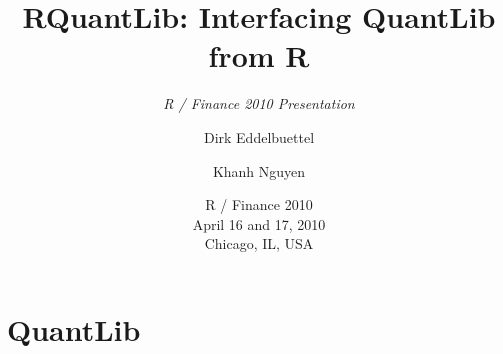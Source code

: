 \documentclass[compress]{beamer}
\title[RQuantLib]{RQuantLib: Interfacing QuantLib from R}  %
\subtitle{\textsl{R / Finance 2010 Presentation}}
\author[Eddelbuettel and Nguyen]{Dirk Eddelbuettel\inst{1} \and Khanh Nguyen\inst{2}}
\institute[Debian and UMASS]{
  \inst{1}%
  Debian Project
  \and 
  \inst{2}
  UMASS at Boston
}
\date[R / Finance 2010]{R / Finance 2010 \\ April 16 and 17, 2010 \\ Chicago, IL, USA}
\begin{document}
\begin{frame}
  \titlepage
\end{frame}


\section{QuantLib}
\end{document}
